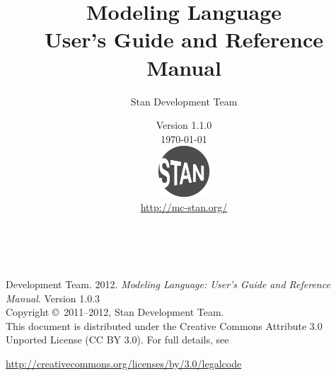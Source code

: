 \title{\Huge\bf \Stan Modeling Language \\[4pt] {\LARGE User's Guide
    and Reference Manual}}
\author{Stan Development Team
}

\date{\vspace*{36pt} \Stan Version 1.1.0 \\[4pt] {\small \today}
\\[36pt]
{
\vfill
\includegraphics[width=0.75in]{../../../logos/stanlogo-main.pdf}}
\\
\vspace*{12pt}
{\small \url{http://mc-stan.org/}}
}
\maketitle

\newpage
\thispagestyle{empty}
\mbox{ }
\vfill
\begin{center}
\begin{minipage}[t]{0.75\textwidth}
\small
\Stan Development Team. 2012.  
{\it \Stan Modeling Language: User's Guide and Reference Manual}. Version
1.0.3
\vspace*{20pt}
\mbox{ }
\\
Copyright \copyright \ 2011--2012, Stan Development Team.
\vspace*{28pt}
\mbox{} \\
This document is distributed under the Creative Commons Attribute 3.0
Unported License (CC BY 3.0).  For full details, see
\begin{center}
\url{http://creativecommons.org/licenses/by/3.0/legalcode} 
\end{center}
\end{minipage}
\vspace*{24pt}
\mbox{ }
\end{center}
